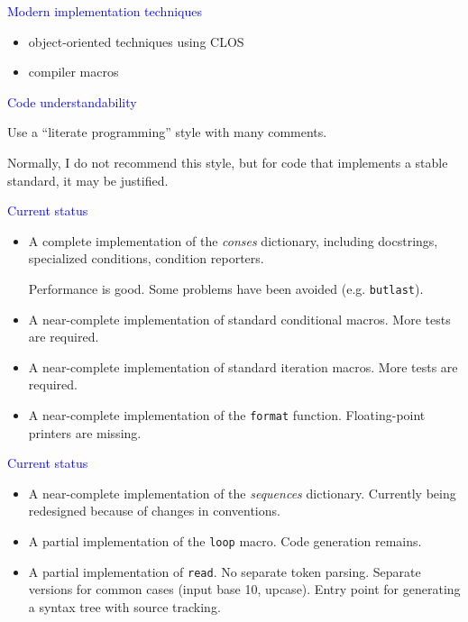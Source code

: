 \documentclass{slides}
\newcommand{\ti}[1]{\begin{center}\Large{\textcolor{blue}{#1}}\end{center}}
\begin{document}
\begin{slide}\ti{Modern implementation techniques}

\begin{itemize}
\item object-oriented techniques using CLOS
\item compiler macros
\end{itemize}

\vfill\end{slide}
\begin{slide}\ti{Code understandability}

Use a ``literate programming'' style with many comments.  

Normally, I do not recommend this style, but for code that implements
a stable standard, it may be justified. 

\vfill\end{slide}
\begin{slide}\ti{Current status}
\begin{itemize}
\item A complete implementation of the \emph{conses} dictionary,
  including docstrings, specialized conditions, condition reporters. 

Performance is good.  Some problems have been avoided
(e.g. \texttt{butlast}). 

\item A near-complete implementation of standard conditional macros.
  More tests are required.
\item A near-complete implementation of standard iteration macros.
  More tests are required.
\item A near-complete implementation of the \texttt{format} function.
  Floating-point printers are missing. 
\end{itemize}
\vfill\end{slide}
\begin{slide}\ti{Current status}
\begin{itemize}
\item A near-complete implementation of the \emph{sequences}
  dictionary.  Currently being redesigned because of changes in
  conventions. 
\item A partial implementation of the \texttt{loop} macro.  Code
  generation remains.  
\item A partial implementation of \texttt{read}.  No separate token
  parsing.  Separate versions for common cases (input base 10,
  upcase).  Entry point for generating a syntax tree with source
  tracking. 
\end{itemize}
\vfill\end{slide}
\end{document}
